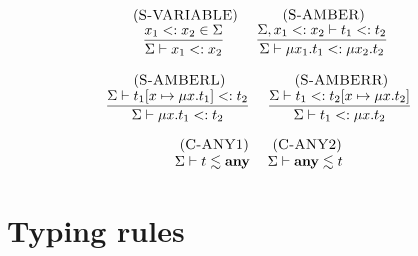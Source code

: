\[
\begin{array}{c}
\begin{array}{c}
\; (\textsc{S-VARIABLE})\\
\dfrac{x_{1} <: x_{2} \in \Sigma}
      {\Sigma \vdash x_{1} <: x_{2}}
\end{array}
\;
\begin{array}{c}
\; (\textsc{S-AMBER})\\
\dfrac{\Sigma, x_{1} <: x_{2} \vdash t_{1} <: t_{2}}
      {\Sigma \vdash \mu x_{1}.t_{1} <: \mu x_{2}.t_{2}}
\end{array}
\\ \\
\begin{array}{c}
\; (\textsc{S-AMBERL})\\
\dfrac{\Sigma \vdash t_{1}[x \mapsto \mu x.t_{1}] <: t_{2}}
      {\Sigma \vdash \mu x.t_{1} <: t_{2}}
\end{array}
\;
\begin{array}{c}
\; (\textsc{S-AMBERR})\\
\dfrac{\Sigma \vdash t_{1} <: t_{2}[x \mapsto \mu x.t_{2}]}
      {\Sigma \vdash t_{1} <: \mu x.t_{2}}
\end{array}
\end{array}
\]

\[
\begin{array}{c}
\begin{array}{c}
\; (\textsc{C-ANY1})\\
\Sigma \vdash t \lesssim \mathbf{any}
\end{array}
\;
\begin{array}{c}
\; (\textsc{C-ANY2})\\
\Sigma \vdash \mathbf{any} \lesssim t
\end{array}
\end{array}
\]

\section{Typing rules}

